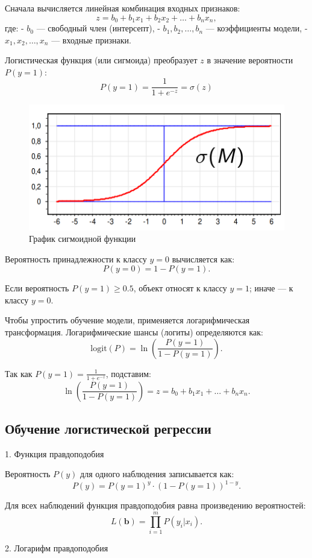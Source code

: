 \begin{itemize}
Сначала вычисляется линейная комбинация входных признаков:
\[
z = b_0 + b_1x_1 + b_2x_2 + \dots + b_nx_n,
\]
где:
- \(b_0\) — свободный член (интерсепт),
- \(b_1, b_2, \dots, b_n\) — коэффициенты модели,
- \(x_1, x_2, \dots, x_n\) — входные признаки.


Логистическая функция (или сигмоида) преобразует \(z\) в значение вероятности \(P(y=1)\):
\[
P(y = 1) = \frac{1}{1 + e^{-z}} = \sigma(z)
\]

\begin{figure}[H]
	\centering
	\includegraphics[width=0.8\linewidth]{chapters/linear/pics/sigmoida.png}
	\caption{График сигмоидной функции}
	\label{fig:sigmoida}
\end{figure}
Вероятность принадлежности к классу \(y=0\) вычисляется как:
\[
P(y = 0) = 1 - P(y = 1).
\]


Если вероятность \(P(y=1) \geq 0.5\), объект относят к классу \(y=1\); иначе — к классу \(y=0\).


Чтобы упростить обучение модели, применяется логарифмическая трансформация. Логарифмические шансы (логиты) определяются как:
\[
\text{logit}(P) = \ln\left(\frac{P(y = 1)}{1 - P(y = 1)}\right).
\]

Так как \(P(y = 1) = \frac{1}{1 + e^{-z}}\), подставим:
\[
\ln\left(\frac{P(y = 1)}{1 - P(y = 1)}\right) = z = b_0 + b_1x_1 + \dots + b_nx_n.
\]

\subsection*{Обучение логистической регрессии}

1. Функция правдоподобия

Вероятность \(P(y)\) для одного наблюдения записывается как:
\[
P(y) = P(y = 1)^{y} \cdot (1 - P(y = 1))^{1 - y}.
\]

Для всех наблюдений функция правдоподобия равна произведению вероятностей:
\[
L(\mathbf{b}) = \prod_{i=1}^m P(y_i | x_i).
\]

2. Логарифм правдоподобия


\end{itemize}
